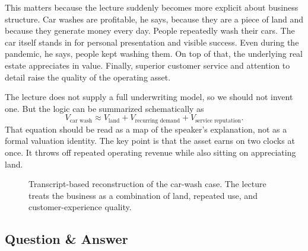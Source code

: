 This matters because the lecture suddenly becomes more explicit about business structure. Car washes are profitable, he says, because they are a piece of land and because they generate money every day. People repeatedly wash their cars. The car itself stands in for personal presentation and visible success. Even during the pandemic, he says, people kept washing them. On top of that, the underlying real estate appreciates in value. Finally, superior customer service and attention to detail raise the quality of the operating asset.

The lecture does not supply a full underwriting model, so we should not invent one. But the logic can be summarized schematically as
\begin{equation}
V_{\text{car wash}}
\approx
V_{\text{land}}
+
V_{\text{recurring demand}}
+
V_{\text{service reputation}}.
\end{equation}
That equation should be read as a map of the speaker's explanation, not as a formal valuation identity. The key point is that the asset earns on two clocks at once. It throws off repeated operating revenue while also sitting on appreciating land.

\begin{figure}[h]
\centering
{}
\caption{Transcript-based reconstruction of the car-wash case. The lecture treats the business as a combination of land, repeated use, and customer-experience quality.}
\end{figure}

\subsection{Question \& Answer}

